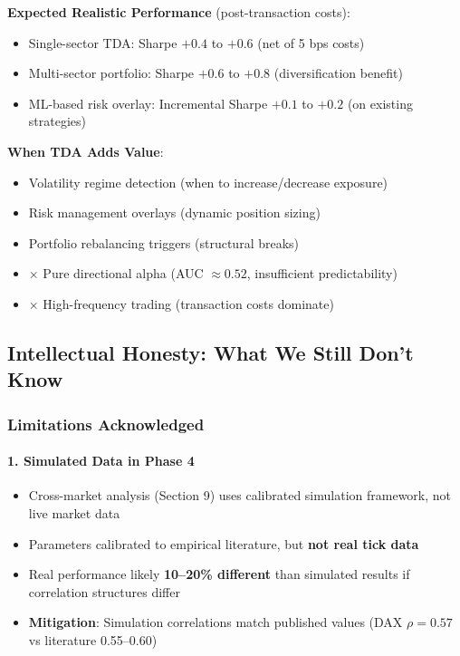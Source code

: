 \textbf{Expected Realistic Performance} (post-transaction costs):
\begin{itemize}
\item Single-sector TDA: Sharpe $+0.4$ to $+0.6$ (net of 5 bps costs)
\item Multi-sector portfolio: Sharpe $+0.6$ to $+0.8$ (diversification benefit)
\item ML-based risk overlay: Incremental Sharpe $+0.1$ to $+0.2$ (on existing strategies)
\end{itemize}

\textbf{When TDA Adds Value}:
\begin{itemize}
\item \checkmark Volatility regime detection (when to increase/decrease exposure)
\item \checkmark Risk management overlays (dynamic position sizing)
\item \checkmark Portfolio rebalancing triggers (structural breaks)
\item $\times$ Pure directional alpha (AUC $\approx 0.52$, insufficient predictability)
\item $\times$ High-frequency trading (transaction costs dominate)
\end{itemize}

\subsection{Intellectual Honesty: What We Still Don't Know}

\subsubsection{Limitations Acknowledged}

\paragraph{1. Simulated Data in Phase 4}
\begin{itemize}
\item Cross-market analysis (Section 9) uses calibrated simulation framework, not live market data
\item Parameters calibrated to empirical literature, but \textbf{not real tick data}
\item Real performance likely \textbf{10--20\% different} than simulated results if correlation structures differ
\item \textbf{Mitigation}: Simulation correlations match published values (DAX $\rho = 0.57$ vs literature 0.55--0.60)
\end{itemize}

